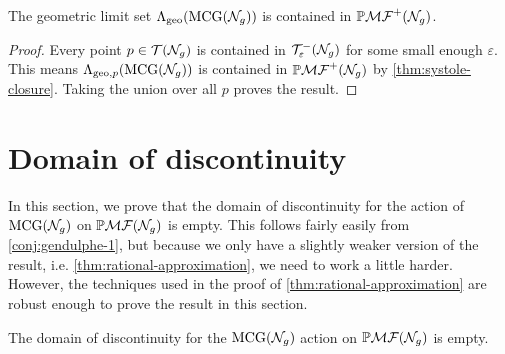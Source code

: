\documentclass[12pt, reqno]{amsart}
\begin{document}
\begin{corollary}
  The geometric limit set $\Lambda_{\mathrm{geo}}(\mathrm{MCG}(\mathcal{N}_g))$ is contained in $\mathbb{P}\mathcal{MF}^+(\mathcal{N}_g)$.
\end{corollary}
\begin{proof}
  Every point $p \in \mathcal{T}(\mathcal{N}_g)$ is contained in $\mathcal{T}_{\varepsilon}^{-}(\mathcal{N}_g)$ for some small enough $\varepsilon$.
  This means $\Lambda_{\mathrm{geo}, p}(\mathrm{MCG}(\mathcal{N}_g))$ is contained in $\mathbb{P}\mathcal{MF}^+(\mathcal{N}_g)$ by \autoref{thm:systole-closure}.
  Taking the union over all $p$ proves the result.
\end{proof}

\section{Domain of discontinuity}
\label{sec:domain-discontinuity}

In this section, we prove that the domain of discontinuity for the action of $\mathrm{MCG}(\mathcal{N}_g)$ on $\mathbb{P}\mathcal{MF}(\mathcal{N}_g)$ is empty.
This follows fairly easily from \autoref{conj:gendulphe-1}, but because we only have a slightly weaker version of the result, i.e. \autoref{thm:rational-approximation}, we need to work a little harder.
However, the techniques used in the proof of \autoref{thm:rational-approximation} are robust enough to prove the result in this section.
\begin{theorem}
  \label{thm:dod-is-empty}
  The domain of discontinuity for the $\mathrm{MCG}(\mathcal{N}_g)$ action on $\mathbb{P}\mathcal{MF}(\mathcal{N}_g)$ is empty.
\end{theorem}
\end{document}
